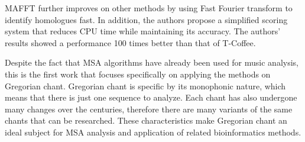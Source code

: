 MAFFT \citep{mafft} further improves on other methods by using Fast Fourier transform to identify homologues fast. In addition, the authors
propose a simplified scoring system that reduces CPU time while maintaining its accuracy. The authors' results showed a performance 
100 times better than that of T-Coffee. 

Despite the fact that MSA algorithms have already been used for music analysis, this is the first work that focuses specifically on applying
the methods on Gregorian chant. Gregorian chant is specific by its monophonic nature, which means that there is just one sequence to analyze.
Each chant has also undergone many changes over the centuries, therefore there are many variants of the same chants that can be
researched. These characteristics make Gregorian chant an ideal subject for MSA analysis and application of related bioinformatics methods.
